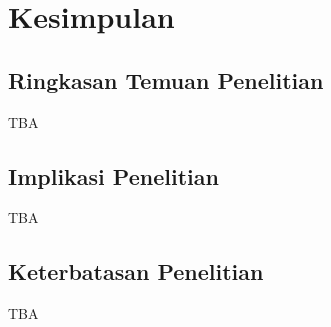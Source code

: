 \section{Kesimpulan}

\subsection{Ringkasan Temuan Penelitian}

TBA

\subsection{Implikasi Penelitian}

TBA

\subsection{Keterbatasan Penelitian}

TBA

\newpage